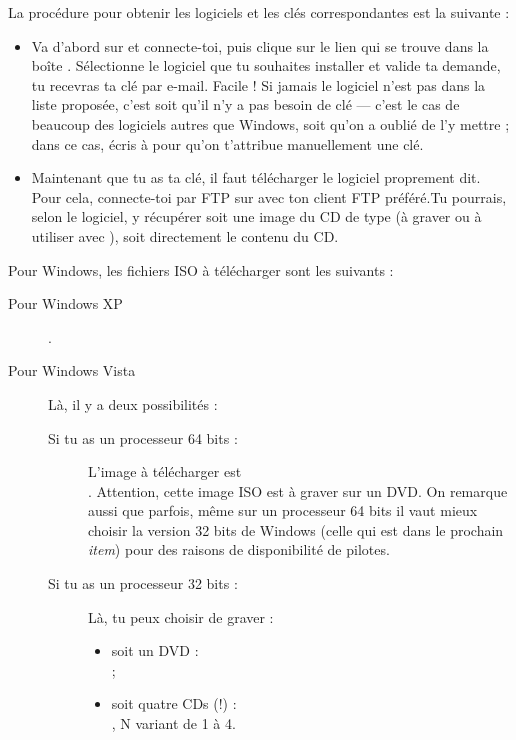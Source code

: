 La procédure pour obtenir les logiciels et les clés correspondantes
est la suivante :
\begin{itemize}

\item Va d'abord sur \fkz et connecte-toi, puis clique sur le lien  qui se trouve dans la bo\^ite . Sélectionne le logiciel que tu souhaites installer et valide ta demande, tu recevras ta clé par e-mail. Facile ! Si jamais le logiciel n'est pas dans la liste proposée, c'est soit qu'il n'y a pas besoin de clé --- c'est le cas de beaucoup des logiciels autres que Windows, soit qu'on a oublié de l'y mettre ; dans ce cas, écris à  pour qu'on t'attribue manuellement une clé.

\item Maintenant que tu as ta clé, il faut télécharger le logiciel proprement
dit. Pour cela, connecte-toi par FTP sur  avec ton client FTP préféré.Tu pourrais, selon le logiciel, y récupérer soit une image du CD de type  (à
graver ou à utiliser avec ), soit directement le contenu du CD.
\end{itemize}

Pour Windows, les fichiers ISO à télécharger sont les suivants :
\begin{description}
\item[Pour Windows XP]
.

\item[Pour Windows Vista]
Là, il y a deux possibilités :
\begin{description}
\item[Si tu as un processeur 64 bits :] L'image à télécharger est \\
. Attention, cette
image ISO est à graver sur un DVD. On remarque aussi que parfois, même sur un processeur 64 bits il
vaut mieux choisir la version 32 bits de Windows (celle qui est dans le prochain \emph{item}) pour des
raisons de disponibilité de pilotes.
\item[Si tu as un processeur 32 bits :] Là, tu peux choisir de graver :
\begin{itemize}
\item soit un DVD : \\
;
\item soit quatre CDs (!) : \\
, N variant
de 1 à 4.

\end{itemize}
\end{description}

\end{description}

